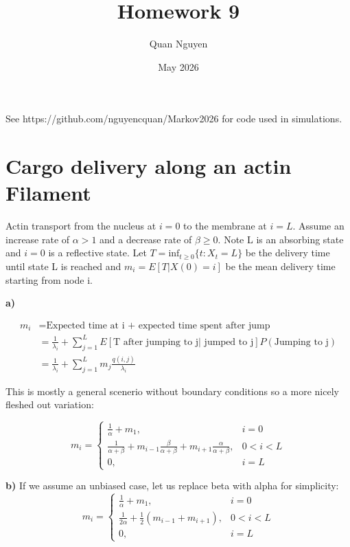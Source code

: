 \documentclass{article}
\title{Homework 9}
\author{Quan Nguyen}
\date{May 2026}
\begin{document}
\maketitle
See https://github.com/nguyencquan/Markov2026 for code used in simulations.
\section{Cargo delivery along an actin Filament}
Actin transport from the nucleus at $i=0$ to the membrane at $i=L$. Assume an 
increase rate of $\alpha > 1$ and a decrease rate of $\beta \geq 0$. Note
L is an absorbing state and $i=0$ is a reflective state. Let $T = \text{inf}_{t\geq0}\{t:X_{t}=L\}$
be the delivery time until state L is reached and $m_{i} = E[T|X(0)=i]$ be
the mean delivery time starting from node i.

\textbf{a)}

\begin{align}
m_{i} &= \text{Expected time at i + expected time spent after jump}\\
&= \frac{1}{\lambda_{i}} + \sum_{j=1}^{L} E[\text{T after jumping to j| jumped to j}]P(\text{Jumping to j})\\
&= \frac{1}{\lambda_{i}} + \sum_{j=1}^{L} m_{j} \frac{q(i,j)}{\lambda_{i}}
\end{align}

This is mostly a general scenerio without boundary conditions
 so a more nicely fleshed out variation:

\begin{equation}
m_{i} = \begin{cases}
    \frac{1}{\alpha} + m_{1},& i = 0\\
    \frac{1}{\alpha+\beta} + m_{i-1} \frac{\beta}{\alpha+\beta} + m_{i+1} \frac{\alpha}{\alpha+\beta},& 0<i<L\\
    0,& i= L
\end{cases}
\end{equation}

\textbf{b)}
If we assume an unbiased case, let us replace beta with alpha for simplicity:
\begin{equation}
m_{i} = \begin{cases}
    \frac{1}{\alpha} + m_{1},& i = 0\\
    \frac{1}{2\alpha} + \frac{1}{2} (m_{i-1} + m_{i+1}),& 0<i<L\\
    0,& i= L
\end{cases}
\end{equation}
\end{document}

